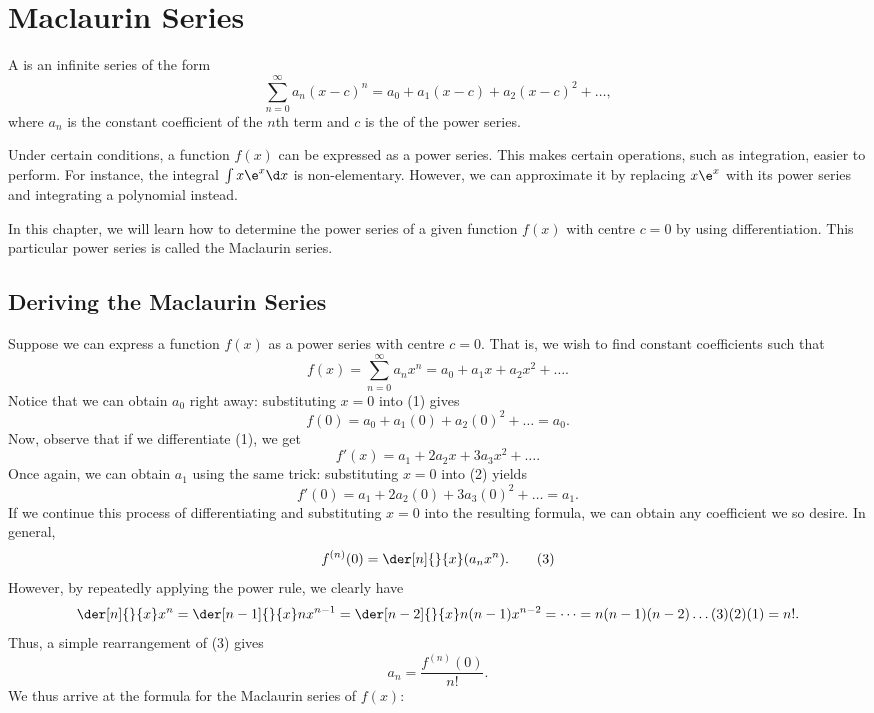 \chapter{Maclaurin Series}\label{chap:Maclaurin-Series}

\begin{definition}
    A  is an infinite series of the form \[\sum_{n=0}^\infty a_n (x-c)^n = a_0 + a_1 (x-c) + a_2 (x-c)^2 + \dots,\] where $a_n$ is the constant coefficient of the $n$th term and $c$ is the  of the power series.
\end{definition}

Under certain conditions, a function $f(x)$ can be expressed as a power series. This makes certain operations, such as integration, easier to perform. For instance, the integral $\int x\e^x \d x$ is non-elementary. However, we can approximate it by replacing $x\e^x$ with its power series and integrating a polynomial instead.

In this chapter, we will learn how to determine the power series of a given function $f(x)$ with centre $c = 0$ by using differentiation. This particular power series is called the Maclaurin series.

\section{Deriving the Maclaurin Series}

Suppose we can express a function $f(x)$ as a power series with centre $c = 0$. That is, we wish to find constant coefficients such that \[f(x) = \sum_{n=0}^\infty a_n x^n = a_0 + a_1 x + a_2 x^2 + \dots. \tag{1}\] Notice that we can obtain $a_0$ right away: substituting $x = 0$ into (1) gives \[f(0) = a_0 + a_1 (0) + a_2 (0)^2 + \dots = a_0.\] Now, observe that if we differentiate (1), we get \[f'(x) = a_1 + 2a_2 x + 3a_3 x^2 + \dots. \tag{2}\] Once again, we can obtain $a_1$ using the same trick: substituting $x = 0$ into (2) yields \[f'(0) = a_1 + 2a_2 (0) + 3a_3 (0)^2 + \dots = a_1.\] If we continue this process of differentiating and substituting $x = 0$ into the resulting formula, we can obtain any coefficient we so desire. In general, \[f^{(n)}(0) = \der[n]{}{x} (a_n x^n). \tag{3}\] However, by repeatedly applying the power rule, we clearly have \[\der[n]{}{x} x^n = \der[n-1]{}{x} nx^{n-1} = \der[n-2]{}{x} n(n-1)x^{n-2} = \dots = n(n-1)(n-2)\dots(3)(2)(1) = n!.\] Thus, a simple rearrangement of (3) gives \[a_n = \frac{f^{(n)}(0)}{n!}.\] We thus arrive at the formula for the Maclaurin series of $f(x)$:

